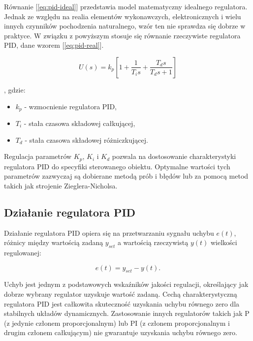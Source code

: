 \hspace*{}

Równanie [\ref{eq:pid-ideal}] przedstawia model matematyczny idealnego regulatora. Jednak ze względu na realia elementów wykonawczych, elektronicznych i wielu innych czynników pochodzenia naturalnego, wzór ten nie sprawdza się dobrze w praktyce. W związku z powyższym stosuje się równanie rzeczywiste regulatora PID, dane wzorem [\ref{eq:pid-real}].

\begin{equation}
    U(s) = k_p [ 1 + \frac{1}{T_i s} + \frac{T_d s}{T_d s + 1}]
    \label{eq:pid-real}
\end{equation}

, gdzie:
\begin{itemize}
    \item \(k_p\) - wzmocnienie regulatora PID,
    \item \(T_i\) - stała czasowa składowej całkującej,
    \item \(T_d\) - stała czasowa składowej różniczkującej.
\end{itemize}



Regulacja parametrów $K_p$, $K_i$ i $K_d$ pozwala na dostosowanie charakterystyki regulatora PID do specyfiki sterowanego obiektu. Optymalne wartości tych parametrów zazwyczaj są dobierane metodą prób i błędów lub za pomocą metod takich jak strojenie Zieglera-Nicholsa.

\subsection{Działanie regulatora PID}

Działanie regulatora PID opiera się na przetwarzaniu sygnału uchybu $e(t)$, różnicy między wartością zadaną $y_{set}$ a wartością rzeczywistą $y(t)$ wielkości regulowanej:

\begin{equation}
e(t) = y_{set} - y(t) .
\end{equation}

Uchyb jest jednym z podstawowych wskaźników jakości regulacji, określający jak dobrze wybrany regulator uzyskuje wartość zadaną. Cechą charakterystyczną regulatora PID jest całkowita skuteczność uzyskania uchybu równego zero dla stabilnych układów dynamicznych. Zastosowanie innych regulatorów takich jak P (z jedynie członem proporcjonalnym) lub PI (z członem proporcjonalnym i drugim 
członem całkującym) nie gwarantuje uzyskania uchybu równego zero. 


